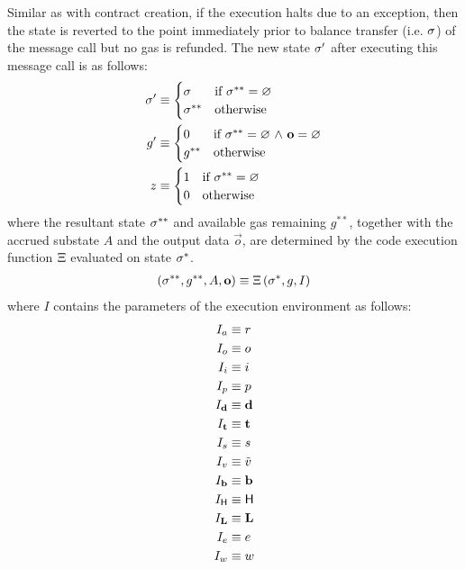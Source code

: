Similar as with contract creation, if the execution halts due to an exception, then the state is reverted to the point immediately prior to balance transfer (i.e. $\mathbf{\sigma}$) of the message call but no gas is refunded.
The new state $\mathbf{\sigma}'$ after executing this message call is as follows:
\begin{align}
	\mathbf{\sigma}' &\equiv 
	\begin{cases}
		\mathbf{\sigma} 	 	& \mbox{if $\mathbf{\sigma}^{**}=\varnothing$}\\
		\mathbf{\sigma}^{**} 	& \mbox{otherwise}
	\end{cases}\\
	g' & \equiv 
	\begin{cases}
		0 & \mbox{if $\mathbf{\sigma}^{**} =\varnothing$ $\land$ $\mathbf{o}=\varnothing$}\\
		g^{**} & \mbox{otherwise}	
	\end{cases}\\
	z &\equiv 
	\begin{cases}
		1	 	& \mbox{if $\mathbf{\sigma}^{**}=\varnothing$}\\
		0	 	& \mbox{otherwise}
	\end{cases}
\end{align}
where the resultant state $\mathbf{\sigma}^{**}$ and available gas remaining $g^{**}$, together with the accrued substate $A$ and the output data $\vec{o}$, 
are determined by the code execution function $\mathrm{\Xi}$ evaluated on state $\mathbf{\sigma}^*$.
\begin{align}
	\left(\mathbf{\sigma}^{**}, g^{**},  A, \mathbf{o} \right) \equiv \mathrm{\Xi} \left(\mathbf{\sigma}^*, g, I  \right)
\end{align}
where $I$ contains the parameters of the execution environment as follows:
\begin{align}
	I_a &\eqdef r\\
	I_o &\eqdef o\\
	I_i &\eqdef i\\
	I_p &\eqdef p\\
	I_\vec{d} &\eqdef \vec{d}\\
	I_\vec{t} &\eqdef \vec{t}\\
	I_s &\eqdef s\\
	I_v &\eqdef \tilde{v}\\
	I_\vec{b} &\eqdef \vec{b}\\
	I_{\head} & \eqdef \head \\
	I_{\mathbf{L}} & \eqdef \mathbf{L}\\ 
	I_e &\eqdef e\\
	I_w &\eqdef w	%
\end{align}




